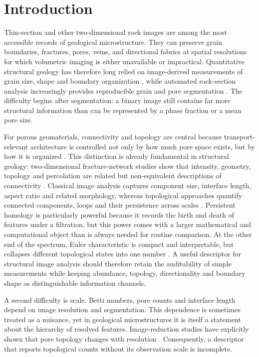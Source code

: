 \documentclass[preprint,12pt,authoryear]{elsarticle}
\begin{document}
\linenumbers

\section{Introduction}

Thin-section and other two-dimensional rock images are among the most accessible records of geological microstructure. They can preserve grain boundaries, fractures, pores, veins, and directional fabrics at spatial resolutions for which volumetric imaging is either unavailable or impractical. Quantitative structural geology has therefore long relied on image-derived measurements of grain size, shape and boundary organization \citep{Heilbronner2000}, while automated rock-section analysis increasingly provides reproducible grain and pore segmentation \citep{Zhang2020}. The difficulty begins after segmentation: a binary image still contains far more structural information than can be represented by a phase fraction or a mean pore size.

For porous geomaterials, connectivity and topology are central because transport-relevant architecture is controlled not only by how much pore space exists, but by how it is organized \citep{Blunt2013}. This distinction is already fundamental in structural geology: two-dimensional fracture-network studies show that intensity, geometry, topology and percolation are related but non-equivalent descriptions of connectivity \citep{SandersonNixon2015,SandersonNixon2018}. Classical image analysis captures component size, interface length, aspect ratio and related morphology, whereas topological approaches quantify connected components, loops and their persistence across scales \citep{Robins2016,Bizhani2021,Liu2026}. Persistent homology is particularly powerful because it records the birth and death of features under a filtration, but this power comes with a larger mathematical and computational object than is always needed for routine comparison. At the other end of the spectrum, Euler characteristic is compact and interpretable, but collapses different topological states into one number \citep{Smith2021}. A useful descriptor for structural image analysis should therefore retain the auditability of simple measurements while keeping abundance, topology, directionality and boundary shape as distinguishable information channels.

A second difficulty is scale. Betti numbers, pore counts and interface length depend on image resolution and segmentation. This dependence is sometimes treated as a nuisance, yet in geological microstructures it is itself a statement about the hierarchy of resolved features. Image-reduction studies have explicitly shown that pore topology changes with resolution \citep{Prokhorov2021}. Consequently, a descriptor that reports topological counts without its observation scale is incomplete.
\end{document}
